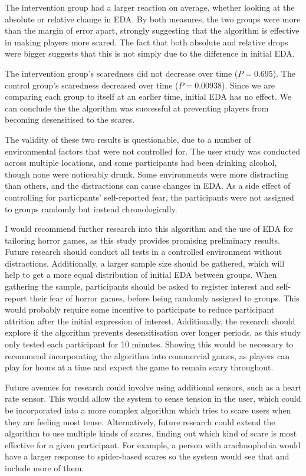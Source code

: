 \documentclass[12pt,a4paper]{article}\usepackage[]{graphicx}\usepackage[]{color}
\begin{document}
The intervention group had a larger reaction on average, whether looking at the absolute or relative change in EDA.
By both measures, the two groups were more than the margin of error apart, strongly suggesting that the algorithm is effective in making players more scared.
The fact that both absolute and relative drops were bigger suggests that this is not simply due to the difference in initial EDA.

The intervention group's scaredness did not decrease over time ($P = 0.695$).
The control group's scaredness decreased over time ($P = 0.00938$).
Since we are comparing each group to itself at an earlier time, initial EDA has no effect.
We can conclude the the algorithm was successful at preventing players from becoming desensitised to the scares.

The validity of these two results is questionable, due to a number of environmental factors that were not controlled for.
The user study was conducted across multiple locations, and some participants had been drinking alcohol, though none were noticeably drunk.
Some environments were more distracting than others, and the distractions can cause changes in EDA.
As a side effect of controlling for particpants' self-reported fear, the participants were not assigned to groups randomly but instead chronologically.

I would recommend further research into this algorithm and the use of EDA for tailoring horror games, as this study provides promising preliminary results.
Future research should conduct all tests in a controlled environment without distractions.
Additionally, a larger sample size should be gathered, which will help to get a more equal distribution of initial EDA between groups.
When gathering the sample, participants should be asked to register interest and self-report their fear of horror games, before being randomly assigned to groups.
This would probably require some incentive to participate to reduce participant attrition after the initial expression of interest.
Additionally, the research should explore if the algorithm prevents desensitisation over longer periods, as this study only tested each participant for 10 minutes.
Showing this would be necessary to recommend incorporating the algorithm into commercial games, as players can play for hours at a time and expect the game to remain scary throughout.

Future avenues for research could involve using additional sensors, such as a heart rate sensor.
This would allow the system to sense tension in the user, which could be incorporated into a more complex algorithm which tries to scare users when they are feeling most tense.
Alternatively, future research could extend the algorithm to use multiple kinds of scares, finding out which kind of scare is most effective for a given participant.
For example, a person with arachnophobia would have a larger response to spider-based scares so the system would see that and include more of them.
\end{document}
